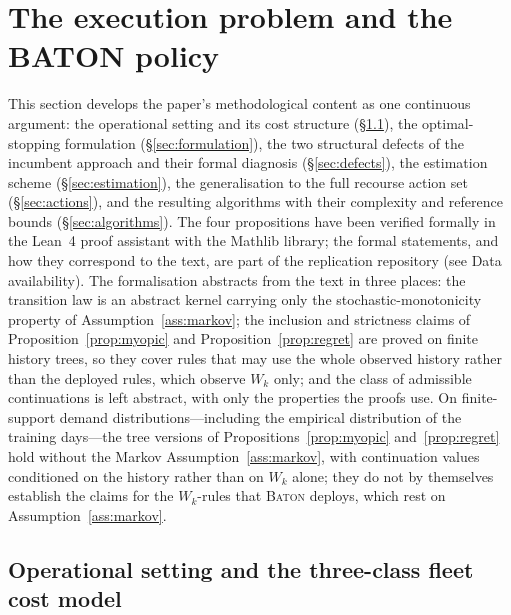 \documentclass[preprint,authoryear,12pt]{elsarticle}
\theoremstyle{definition}
\theoremstyle{remark}
\begin{document}
\section{The execution problem and the BATON policy}
\label{sec:method}

This section develops the paper's methodological content as one
continuous argument: the operational setting and its cost structure
(\S\ref{sec:setting}), the optimal-stopping formulation
(\S\ref{sec:formulation}), the two structural defects of the incumbent
approach and their formal diagnosis (\S\ref{sec:defects}), the
estimation scheme (\S\ref{sec:estimation}), the generalisation to the
full recourse action set (\S\ref{sec:actions}), and the resulting
algorithms with their complexity and reference bounds
(\S\ref{sec:algorithms}). The four propositions have been verified
formally in the Lean~4 proof assistant with the Mathlib library; the
formal statements, and how they correspond to the text, are part of the
replication repository (see Data availability). The formalisation
abstracts from the text in three places: the transition law is an
abstract kernel carrying only the stochastic-monotonicity property of
Assumption~\ref{ass:markov}; the inclusion and strictness claims of
Proposition~\ref{prop:myopic} and Proposition~\ref{prop:regret} are
proved on finite history trees, so they cover rules that may use the
whole observed history rather than the deployed rules, which observe
$W_k$ only; and the class of admissible continuations is left abstract,
with only the properties the proofs use. On finite-support demand
distributions---including the empirical distribution of the training
days---the tree versions of Propositions~\ref{prop:myopic}
and~\ref{prop:regret} hold without the Markov
Assumption~\ref{ass:markov}, with continuation values conditioned on the
history rather than on $W_k$ alone; they do not by themselves establish
the claims for the $W_k$-rules that \textsc{Baton} deploys, which rest
on Assumption~\ref{ass:markov}.

\subsection{Operational setting and the three-class fleet cost model}
\label{sec:setting}
\end{document}
